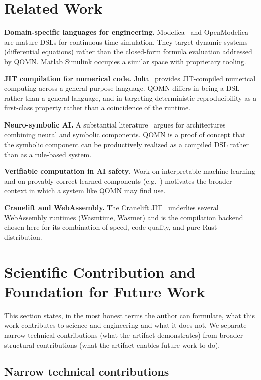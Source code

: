 \documentclass[11pt,a4paper]{article}
\begin{document}
\section{Related Work}
\label{sec:related}

\textbf{Domain-specific languages for engineering.} Modelica~\cite{modelica} and OpenModelica are mature DSLs for continuous-time simulation. They target dynamic systems (differential equations) rather than the closed-form formula evaluation addressed by QOMN. Matlab Simulink occupies a similar space with proprietary tooling.

\textbf{JIT compilation for numerical code.} Julia~\cite{julia} provides JIT-compiled numerical computing across a general-purpose language. QOMN differs in being a DSL rather than a general language, and in targeting deterministic reproducibility as a first-class property rather than a coincidence of the runtime.

\textbf{Neuro-symbolic AI.} A substantial literature~\cite{neurosymbolic-garcez,neurosymbolic-raedt} argues for architectures combining neural and symbolic components. QOMN is a proof of concept that the symbolic component can be productively realized as a compiled DSL rather than as a rule-based system.

\textbf{Verifiable computation in AI safety.} Work on interpretable machine learning and on provably correct learned components (e.g.~\cite{safe-ai-sculley}) motivates the broader context in which a system like QOMN may find use.

\textbf{Cranelift and WebAssembly.} The Cranelift JIT~\cite{cranelift} underlies several WebAssembly runtimes (Wasmtime, Wasmer) and is the compilation backend chosen here for its combination of speed, code quality, and pure-Rust distribution.

\section{Scientific Contribution and Foundation for Future Work}
\label{sec:scientific}

This section states, in the most honest terms the author can formulate, what this work contributes to science and engineering and what it does not. We separate narrow technical contributions (what the artifact demonstrates) from broader structural contributions (what the artifact enables future work to do).

\subsection{Narrow technical contributions}
\end{document}
